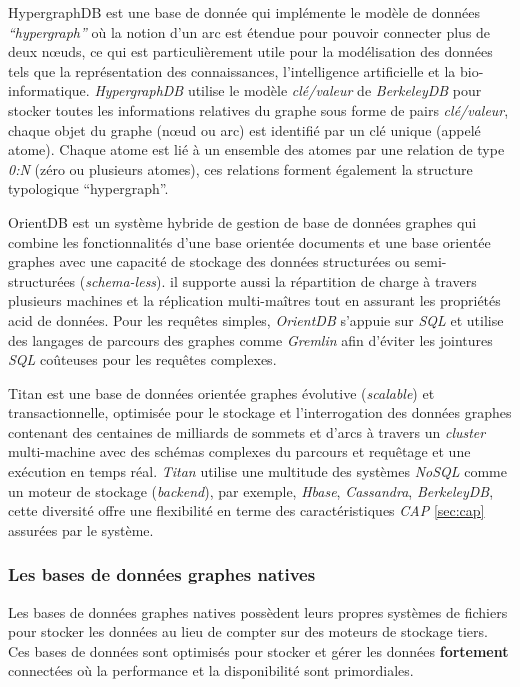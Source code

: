     \textsf{HypergraphDB} \cite{hypergraphdb,
      iordanov2010hypergraphdb} est une base de donnée qui implémente
    le modèle de données \emph{``hypergraph''} où la notion d'un arc
    est étendue pour pouvoir connecter plus de deux nœuds, ce qui est
    particulièrement utile pour la modélisation des données tels que
    la représentation des connaissances, l'intelligence artificielle
    et la bio-informatique. \emph{HypergraphDB} utilise le modèle
    \textit{clé/valeur} de \emph{BerkeleyDB} \cite{berkeleydb} pour
    stocker toutes les informations relatives du graphe sous forme de
    pairs \textit{clé/valeur}, chaque objet du graphe (nœud ou arc)
    est identifié par un clé unique (appelé atome). Chaque atome est
    lié à un ensemble des atomes par une relation de type \emph{0:N}
    (zéro ou plusieurs atomes), ces relations forment également la
    structure typologique ``hypergraph''.\bigskip

    \textsf{OrientDB} \cite{orientdb} est un système hybride de
    gestion de base de données graphes qui combine les fonctionnalités
    d'une base orientée documents et une base orientée graphes avec
    une capacité de stockage des données structurées ou
    semi-structurées (\emph{schema-less}). il supporte aussi la
    répartition de charge à travers plusieurs machines et la
    réplication multi-maîtres tout en assurant les propriétés
    \acrshort{acid} de données. Pour les requêtes simples,
    \emph{OrientDB} s'appuie sur \emph{SQL} et utilise des langages de
    parcours des graphes comme \emph{Gremlin} afin d'éviter les
    jointures \emph{SQL} coûteuses pour les requêtes
    complexes.\bigskip

    \textsf{Titan} \cite{titan} est une base de données orientée
    graphes évolutive (\emph{scalable}) et transactionnelle, optimisée
    pour le stockage et l'interrogation des données graphes contenant
    des centaines de milliards de sommets et d'arcs à travers un
    \emph{cluster} multi-machine avec des schémas complexes du
    parcours et requêtage et une exécution en temps réal. \emph{Titan}
    utilise une multitude des systèmes \emph{NoSQL} comme un moteur de
    stockage (\emph{backend}), par exemple, \emph{Hbase},
    \emph{Cassandra}, \emph{BerkeleyDB}, cette diversité offre une
    flexibilité en terme des caractéristiques \emph{CAP} \ref{sec:cap}
    assurées par le système.

    \subsubsection{Les bases de données graphes natives}
    \label{sec:graphdb-native}
    Les bases de données graphes natives possèdent leurs propres
    systèmes de fichiers pour stocker les données au lieu de compter
    sur des moteurs de stockage tiers. Ces bases de données sont
    optimisés pour stocker et gérer les données \textbf{fortement}
    connectées où la performance et la disponibilité sont
    primordiales.\bigskip

